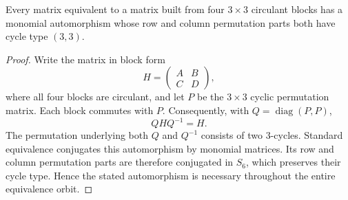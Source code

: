 
\begin{lemma}
\label{lem:supp-dita-automorphism}
Every matrix equivalent to a matrix built from four $3\times3$ circulant blocks has a monomial automorphism whose row and column permutation parts both have cycle type $(3,3)$.
\end{lemma}

\begin{proof}
Write the matrix in block form
\begin{equation}
H=\begin{pmatrix}A&B\\ C&D\end{pmatrix},
\label{eq:supp-four-circulant-block-form}
\end{equation}
where all four blocks are circulant, and let $P$ be the $3\times3$ cyclic permutation matrix.  Each block commutes with $P$.  Consequently, with $Q=\operatorname{diag}(P,P)$,
\begin{equation}
QHQ^{-1}=H.
\label{eq:supp-four-circulant-automorphism}
\end{equation}
The permutation underlying both $Q$ and $Q^{-1}$ consists of two 3-cycles.  Standard equivalence conjugates this automorphism by monomial matrices.  Its row and column permutation parts are therefore conjugated in $S_6$, which preserves their cycle type.  Hence the stated automorphism is necessary throughout the entire equivalence orbit.
\end{proof}


